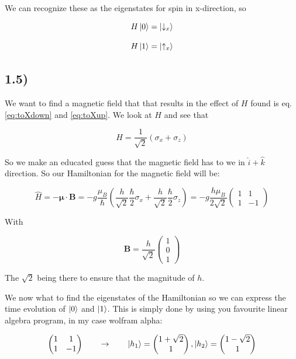 \documentclass[a4paper,norsk, 10pt]{article}
\begin{document}
We can recognize these as the eigenstates for spin in x-direction, so

\begin{equation}
H\ket{0} = \ket{\downarrow_x}
\end{equation}\label{eq:toXdown}

\begin{equation}
H\ket{1} = \ket{\uparrow_x}
\end{equation}\label{eq:toXup}


\subsection{1.5)}
We want to find a magnetic field that that results in the effect of $H$ found is eq. \eqref{eq:toXdown} and \eqref{eq:toXup}. We look at $H$ and see that

\begin{equation}
H = \frac{1}{\sqrt{2}}\left(\sigma_x + \sigma_z\right)
\end{equation}

So we make an educated guess that the magnetic field has to we in $\hat{i} + \hat{k}$ direction. So our Hamiltonian for the magnetic field will be:

\begin{equation}
\hat{H} = -\mathbf{\mu}\cdot \mathbf{B} = - g\frac{\mu_B}{\hbar}\left(\frac{h}{\sqrt{2}}\frac{\hbar}{2}\sigma_x + \frac{h}{\sqrt{2}}\frac{\hbar}{2}\sigma_z\right) = -g\frac{h\mu_B}{2\sqrt{2}}
\begin{pmatrix}
1 & 1 \\
1 & -1
\end{pmatrix}
\end{equation}

With

\begin{equation}
\mathbf{B} = \frac{h}{\sqrt{2}}
\begin{pmatrix}
1 \\ 0 \\ 1
\end{pmatrix}
\end{equation}

The $\sqrt{2}$ being there to ensure that the magnitude of $h$. 

We now what to find the eigenstates of the Hamiltonian so we can express the time evolution of $\ket{0}$ and $\ket{1}$. This is simply done by using you favourite linear algebra program, in my case wolfram alpha:

\begin{equation}
\begin{pmatrix}
1 & 1 \\
1 & -1
\end{pmatrix}
\qquad
\rightarrow
\qquad
\ket{h_1} = 
\begin{pmatrix}
1 + \sqrt{2} \\ 1
\end{pmatrix},
\ket{h_2} = 
\begin{pmatrix}
1 - \sqrt{2} \\ 1
\end{pmatrix}
\end{equation}
\end{document}
